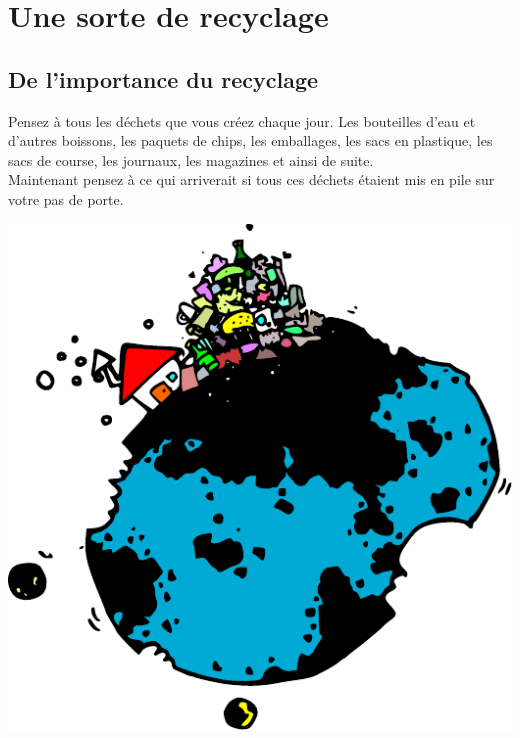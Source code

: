 



\chapter{Une sorte de recyclage}\label{chap:recyclage}
\section{De l'importance du recyclage}
Pensez à tous les déchets que vous créez chaque jour. Les bouteilles d'eau et d'autres boissons, les paquets de chips, les emballages, les sacs en plastique, les sacs de course, les journaux, les magazines et ainsi de suite.\\

Maintenant pensez à ce qui arriverait si tous ces déchets étaient mis en pile sur votre pas de porte.

\begin{center}
 \includegraphics{images/recycler.pdf}
\end{center}

